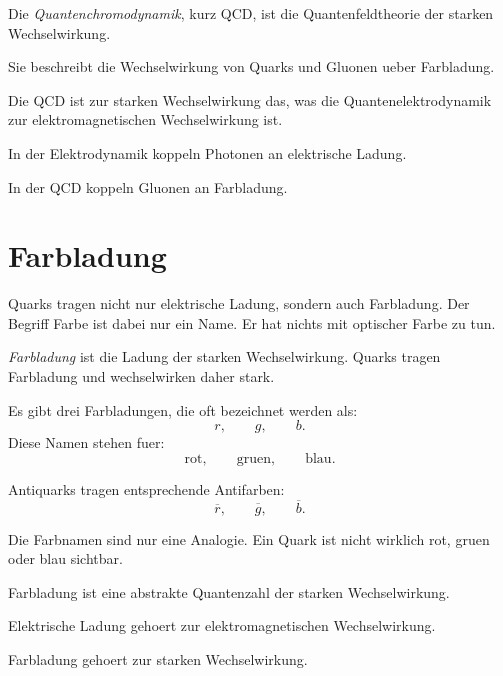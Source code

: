 \begin{definitionbox}
Die \emph{Quantenchromodynamik}, kurz QCD, ist die Quantenfeldtheorie der starken
Wechselwirkung.

Sie beschreibt die Wechselwirkung von Quarks und Gluonen ueber Farbladung.
\end{definitionbox}

\begin{conceptbox}
Die QCD ist zur starken Wechselwirkung das, was die Quantenelektrodynamik zur
elektromagnetischen Wechselwirkung ist.

In der Elektrodynamik koppeln Photonen an elektrische Ladung.

In der QCD koppeln Gluonen an Farbladung.
\end{conceptbox}

\section{Farbladung}

Quarks tragen nicht nur elektrische Ladung, sondern auch Farbladung.
Der Begriff Farbe ist dabei nur ein Name.
Er hat nichts mit optischer Farbe zu tun.

\begin{definitionbox}
\emph{Farbladung} ist die Ladung der starken Wechselwirkung.
Quarks tragen Farbladung und wechselwirken daher stark.
\end{definitionbox}

\begin{conceptbox}
Es gibt drei Farbladungen, die oft bezeichnet werden als:
\[
    r,\qquad g,\qquad b.
\]
Diese Namen stehen fuer:
\[
    \text{rot},\qquad \text{gruen},\qquad \text{blau}.
\]

Antiquarks tragen entsprechende Antifarben:
\[
    \overline{r},
    \qquad
    \overline{g},
    \qquad
    \overline{b}.
\]
\end{conceptbox}

\begin{notebox}
Die Farbnamen sind nur eine Analogie.
Ein Quark ist nicht wirklich rot, gruen oder blau sichtbar.

Farbladung ist eine abstrakte Quantenzahl der starken Wechselwirkung.
\end{notebox}

\begin{examtipbox}
Elektrische Ladung gehoert zur elektromagnetischen Wechselwirkung.

Farbladung gehoert zur starken Wechselwirkung.
\end{examtipbox}

